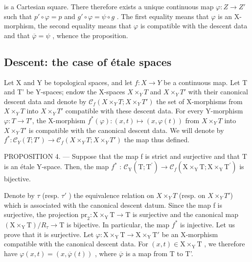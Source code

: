 is a Cartesian square. There therefore exists a unique continuous map \(\varphi\colon Z\to Z'\) such that \(p'\circ\varphi=p\) and \(g'\circ\varphi=\psi\circ g\) . The first equality means that \(\varphi\) is an X-morphism, the second equality means that \(\varphi\) is compatible with the descent data and that \(\overline{\varphi}=\psi\) , whence the proposition.

\subsection{Descent: the case of étale spaces}

Let X and Y be topological spaces, and let \(f\colon X\to Y\) be a continuous map. Let T and T' be Y-spaces; endow the X-spaces \(X\times_{Y}T\) and \(X\times_{Y}T'\) with their canonical descent data and denote by \(\mathcal{C}_{f}(X\times_{Y}T;X\times_{Y}T')\) the set of X-morphisms from \(X\times_{Y}T\) into \(X\times_{Y}T'\) compatible with these descent data. For every Y-morphism \(\varphi\colon T\to T'\), the X-morphism \(f^{*}(\varphi)\colon(x,t)\mapsto(x,\varphi(t))\) from \(X\times_{Y}T\) into \(X\times_{Y}T'\) is compatible with the canonical descent data. We will denote by \(f^{*}\colon\mathcal{C}_{Y}(T;T')\to\mathcal{C}_{f}(X\times_{Y}T;X\times_{Y}T')\) the map thus defined.

PROPOSITION 4. --- Suppose that the map f is strict and surjective and that T is an étale Y-space. Then, the map \(f^{*}\) : \(\mathcal{C}_{\mathrm{Y}}(\mathrm{T};\mathrm{T}^{\prime}) \to \mathcal{C}_{f}(\mathrm{X} \times_{\mathrm{Y}} \mathrm{T}; \mathrm{X} \times_{\mathrm{Y}} \mathrm{T}^{\prime})\) is bijective.

Denote by \(\tau\) (resp. \(\tau'\) ) the equivalence relation on \(X\times_{Y}T\) (resp. on \(X\times_{Y}T'\)) which is associated with the canonical descent datum. Since the map f is surjective, the projection \(\mathrm{pr}_2\colon \mathrm{X}\times_{\mathrm{Y}}\mathrm{T} \to \mathrm{T}\) is surjective and the canonical map \((\mathrm{X}\times_{\mathrm{Y}}\mathrm{T})/R_{\tau} \to \mathrm{T}\) is bijective. In particular, the map \(f^*\) is injective. Let us prove that it is surjective. Let \(\varphi\colon \mathrm{X}\times_{\mathrm{Y}}\mathrm{T} \to \mathrm{X}\times_{\mathrm{Y}}\mathrm{T}'\) be an X-morphism compatible with the canonical descent data. For \((x,t) \in \mathrm{X}\times_{\mathrm{Y}}\mathrm{T}\) , we therefore have \(\varphi(x,t) = (x,\overline{\varphi}(t))\) , where \(\overline{\varphi}\) is a map from T to T'.

